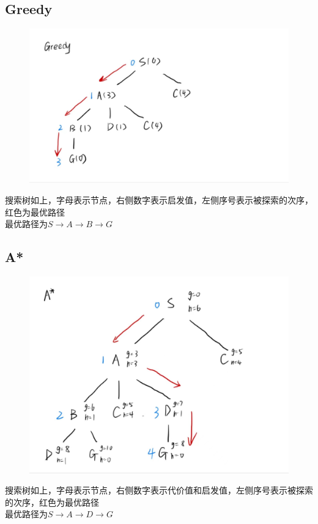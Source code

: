 \documentclass[12pt,a4paper]{article}
\begin{document}
\subsection{Greedy}
\begin{figure}[H]
    \centering
    \includegraphics[scale = 0.2]{greedy.jpg}
    \label{figure}
\end{figure}
搜索树如上，字母表示节点，右侧数字表示启发值，左侧序号表示被探索的次序，红色为最优路径\\
最优路径为$S\rightarrow A \rightarrow B\rightarrow G$
\subsection{A*}
\begin{figure}[H]
    \centering
    \includegraphics[scale = 0.2]{A.jpg}
    \label{figure}
\end{figure}
搜索树如上，字母表示节点，右侧数字表示代价值和启发值，左侧序号表示被探索的次序，红色为最优路径\\
最优路径为$S\rightarrow A \rightarrow D\rightarrow G$
\end{document}
